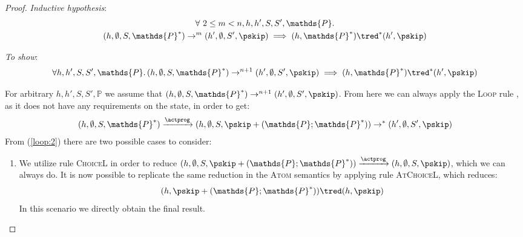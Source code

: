 \begin{thm}
{\begin{proof}
\textit{Inductive hypothesis}:
\begin{gather*}
	\forall\ 2 \leq m < n, h, h', S, S', \mathds{P} \ldotp \\
	(h, \emptyset, S, \mathds{P}^*) \rightarrow^{m} (h', \emptyset, S', \pskip) \implies 
	(h, \mathds{P}^* ) \tred^* (h', \pskip)
\end{gather*}

\textit{To show}:
\[
	\forall h, h', S, S', \mathds{P} \ldotp
	(h, \emptyset, S, \mathds{P}^*) \rightarrow^{n + 1} (h', \emptyset, S', \pskip) \implies 
	(h, \mathds{P}^* ) \tred^* (h', \pskip)
\]

For arbitrary $h, h', S, S', \mathds{P}$ we assume that $(h, \emptyset, S, \mathds{P}^*) \rightarrow^{n+1} (h', \emptyset, S', \pskip)$. From here we can always apply the \textsc{Loop} rule , as it does not have any requirements on the state, in order to get:
\begin{gather}
	\label{loop:2}
	(h, \emptyset, S, \mathds{P}^*) \xrightarrow{\actprog} (h, \emptyset, S, \pskip + (\mathds{P} ; \mathds{P}^*)) \rightarrow^* (h', \emptyset, S', \pskip)
\end{gather}
From (\ref{loop:2}) there are two possible cases to consider:
\begin{enumerate}
	\item We utilize rule \textsc{ChoiceL} in order to reduce $(h, \emptyset, S, \pskip + (\mathds{P} ; \mathds{P}^*)) \xrightarrow{\actprog} (h, \emptyset, S, \pskip)$, which we can always do. It is now possible to replicate the same reduction in the \textsc{Atom} semantics by applying rule \textsc{AtChoiceL}, which reduces:
	\[
		(h, \pskip + (\mathds{P} ; \mathds{P}^*)) \tred (h, \pskip)
	\]
	In this scenario we directly obtain the final result.
	

\end{enumerate}
\end{proof}}
\end{thm}
